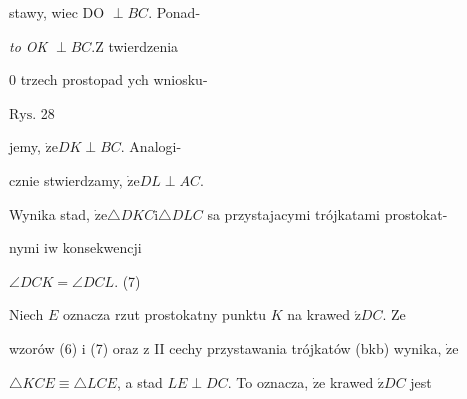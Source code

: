 \documentclass[a4paper,12pt]{article}
\begin{document}
stawy, wiec DO $\perp BC$. Ponad-

{\it to OK} $\perp BC. \mathrm{Z}$ twierdzenia

$0$ trzech prostopad ych wniosku-

$\mathrm{R}\mathrm{y}\mathrm{s}$. 28

jemy, $\dot{\mathrm{z}}\mathrm{e} DK \perp BC$. Analogi-

cznie stwierdzamy, $\dot{\mathrm{z}}\mathrm{e} DL\perp AC.$

Wynika stad, $\dot{\mathrm{z}}\mathrm{e}\triangle DKC\mathrm{i}\triangle DLC$ sa przystajacymi trójkatami prostokat-

nymi $\mathrm{i}\mathrm{w}$ konsekwencji

$\angle DCK=\angle DCL$.   (7)

Niech $E$ oznacza rzut prostokatny punktu $K$ na krawed $\acute{\mathrm{z}} DC$. Ze

wzorów (6) $\mathrm{i}$ (7) oraz $\mathrm{z}$ II cechy przystawania trójkatów (bkb) wynika, $\dot{\mathrm{z}}\mathrm{e}$

$\triangle KCE \equiv \triangle LCE$, a stad $ LE\perp DC$. To oznacza, $\dot{\mathrm{z}}\mathrm{e}$ krawed $\acute{\mathrm{z}} DC$ jest
\end{document}
